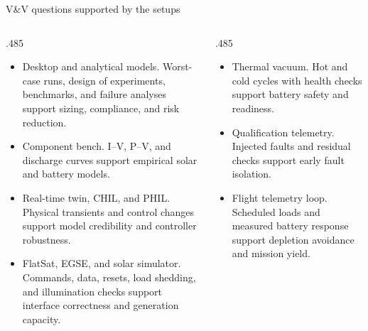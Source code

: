 \documentclass[aspectratio=169,10pt]{beamer}
\newcommand{\term}[1]{{\color{Ink}#1}}
\newenvironment{tightitems}{%
  \begin{itemize}\setlength{\itemsep}{.52em}\setlength{\topsep}{.15em}\setlength{\parskip}{0pt}%
}{\end{itemize}}
\begin{document}
\begin{frame}{V\&V questions supported by the setups}
  \begin{columns}[T,onlytextwidth]
    \begin{column}{.485\textwidth}
      \begin{tightitems}
        \item \term{Desktop and analytical models}. Worst-case runs, design of experiments, benchmarks, and failure analyses support sizing, compliance, and risk reduction.
        \item \term{Component bench}. I--V, P--V, and discharge curves support empirical solar and battery models.
        \item \term{Real-time twin, CHIL, and PHIL}. Physical transients and control changes support model credibility and controller robustness.
        \item \term{FlatSat, EGSE, and solar simulator}. Commands, data, resets, load shedding, and illumination checks support interface correctness and generation capacity.
      \end{tightitems}
    \end{column}
    \begin{column}{.485\textwidth}
      \begin{tightitems}
        \item \term{Thermal vacuum}. Hot and cold cycles with health checks support battery safety and readiness.
        \item \term{Qualification telemetry}. Injected faults and residual checks support early fault isolation.
        \item \term{Flight telemetry loop}. Scheduled loads and measured battery response support depletion avoidance and mission yield.
      \end{tightitems}
    \end{column}
  \end{columns}
\end{frame}
\end{document}
